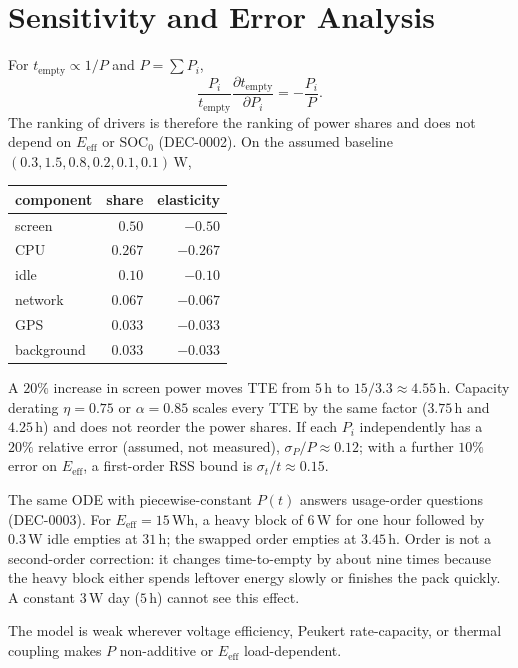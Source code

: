 \documentclass[11pt,letterpaper]{article}
\begin{document}
\section{Sensitivity and Error Analysis}
For \(t_{\mathrm{empty}}\propto 1/P\) and \(P=\sum P_i\),
\begin{equation}
\frac{P_i}{t_{\mathrm{empty}}}\frac{\partial t_{\mathrm{empty}}}{\partial P_i}=-\frac{P_i}{P}.
\end{equation}
The ranking of drivers is therefore the ranking of power shares and does not depend on
\(E_{\mathrm{eff}}\) or \(\mathrm{SOC}_0\) (DEC-0002).
On the assumed baseline \((0.3,1.5,0.8,0.2,0.1,0.1)\,\mathrm{W}\),
\begin{center}
\begin{tabular}{lrr}
\toprule
component & share & elasticity \\
\midrule
screen & $0.50$ & $-0.50$ \\
CPU & $0.267$ & $-0.267$ \\
idle & $0.10$ & $-0.10$ \\
network & $0.067$ & $-0.067$ \\
GPS & $0.033$ & $-0.033$ \\
background & $0.033$ & $-0.033$ \\
\bottomrule
\end{tabular}
\end{center}
A \(20\%\) increase in screen power moves TTE from \(5\,\mathrm{h}\) to \(15/3.3\approx 4.55\,\mathrm{h}\).
Capacity derating \(\eta=0.75\) or \(\alpha=0.85\) scales every TTE by the same factor
(\(3.75\,\mathrm{h}\) and \(4.25\,\mathrm{h}\)) and does not reorder the power shares.
If each \(P_i\) independently has a \(20\%\) relative error (assumed, not measured),
\(\sigma_P/P\approx 0.12\); with a further \(10\%\) error on \(E_{\mathrm{eff}}\),
a first-order RSS bound is \(\sigma_t/t\approx 0.15\).

The same ODE with piecewise-constant \(P(t)\) answers usage-order questions (DEC-0003).
For \(E_{\mathrm{eff}}=15\,\mathrm{Wh}\), a heavy block of \(6\,\mathrm{W}\) for one hour
followed by \(0.3\,\mathrm{W}\) idle empties at \(31\,\mathrm{h}\);
the swapped order empties at \(3.45\,\mathrm{h}\).
Order is not a second-order correction: it changes time-to-empty by about nine times
because the heavy block either spends leftover energy slowly or finishes the pack quickly.
A constant \(3\,\mathrm{W}\) day (\(5\,\mathrm{h}\)) cannot see this effect.

The model is weak wherever voltage efficiency, Peukert rate-capacity, or thermal coupling
makes \(P\) non-additive or \(E_{\mathrm{eff}}\) load-dependent.
\end{document}

